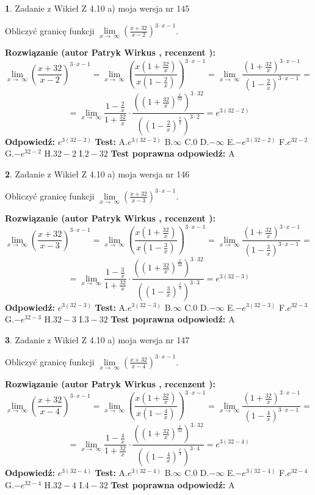 \documentclass[12pt, a4paper]{article}
\theoremstyle{definition} %
\newtheorem{zad}{}
\newcommand{\zadStart}[1]{\begin{zad}#1\newline}
\newcommand{\zadStop}{\end{zad}}
\newcommand{\rozwStart}[2]{\noindent \textbf{Rozwiązanie (autor #1 , recenzent #2): }\newline}
\newcommand{\rozwStop}{\newline}
\newcommand{\odpStart}{\noindent \textbf{Odpowiedź:}\newline}
\newcommand{\odpStop}{\newline}
\newcommand{\testStart}{\noindent \textbf{Test:}\newline}
\newcommand{\testStop}{\newline}
\newcommand{\kluczStart}{\noindent \textbf{Test poprawna odpowiedź:}\newline}
\newcommand{\kluczStop}{\newline}
\begin{document}
\zadStart{Zadanie z Wikieł Z 4.10 a) moja wersja nr 145}


Obliczyć granicę funkcji  $\lim\limits_{x\to\ \infty}(\frac{x+32}{x-2})^{3\cdot x-1}$.
\zadStop
\rozwStart{Patryk Wirkus}{}
$$\lim\limits_{x\to\ \infty}(\frac{x+32}{x-2})^{3\cdot x-1} = \lim\limits_{x\to\ \infty}(\frac{x(1+\frac{32}{x})}{x(1-\frac{2}{x})})^{3\cdot x-1}=\lim\limits_{x\to\ \infty}\frac{(1+\frac{32}{x})^{3\cdot x-1}}{(1-\frac{2}{x})^{3\cdot x-1}}=$$
$$=\lim\limits_{x\to\ \infty}\frac{1-\frac{2}{x}}{1+\frac{32}{x}}\cdot\frac{((1+\frac{32}{x})^{\frac{x}{32}})^{3\cdot32}}{((1-\frac{2}{x})^{\frac{x}{2}})^{3\cdot2}}=e^{3(32-2)}$$
\rozwStop
\odpStart
$e^{3(32-2)}$
\odpStop
\testStart
A.$e^{3(32-2)}$ B.$\infty$ C.$0$ D.$-\infty$ E.$-e^{3(32-2)}$
F.$e^{32-2}$ G.$-e^{32-2}$
H.$32-2$
I.$2-32$
\testStop
\kluczStart
A
\kluczStop



\zadStart{Zadanie z Wikieł Z 4.10 a) moja wersja nr 146}


Obliczyć granicę funkcji  $\lim\limits_{x\to\ \infty}(\frac{x+32}{x-3})^{3\cdot x-1}$.
\zadStop
\rozwStart{Patryk Wirkus}{}
$$\lim\limits_{x\to\ \infty}(\frac{x+32}{x-3})^{3\cdot x-1} = \lim\limits_{x\to\ \infty}(\frac{x(1+\frac{32}{x})}{x(1-\frac{3}{x})})^{3\cdot x-1}=\lim\limits_{x\to\ \infty}\frac{(1+\frac{32}{x})^{3\cdot x-1}}{(1-\frac{3}{x})^{3\cdot x-1}}=$$
$$=\lim\limits_{x\to\ \infty}\frac{1-\frac{3}{x}}{1+\frac{32}{x}}\cdot\frac{((1+\frac{32}{x})^{\frac{x}{32}})^{3\cdot32}}{((1-\frac{3}{x})^{\frac{x}{3}})^{3\cdot3}}=e^{3(32-3)}$$
\rozwStop
\odpStart
$e^{3(32-3)}$
\odpStop
\testStart
A.$e^{3(32-3)}$ B.$\infty$ C.$0$ D.$-\infty$ E.$-e^{3(32-3)}$
F.$e^{32-3}$ G.$-e^{32-3}$
H.$32-3$
I.$3-32$
\testStop
\kluczStart
A
\kluczStop



\zadStart{Zadanie z Wikieł Z 4.10 a) moja wersja nr 147}


Obliczyć granicę funkcji  $\lim\limits_{x\to\ \infty}(\frac{x+32}{x-4})^{3\cdot x-1}$.
\zadStop
\rozwStart{Patryk Wirkus}{}
$$\lim\limits_{x\to\ \infty}(\frac{x+32}{x-4})^{3\cdot x-1} = \lim\limits_{x\to\ \infty}(\frac{x(1+\frac{32}{x})}{x(1-\frac{4}{x})})^{3\cdot x-1}=\lim\limits_{x\to\ \infty}\frac{(1+\frac{32}{x})^{3\cdot x-1}}{(1-\frac{4}{x})^{3\cdot x-1}}=$$
$$=\lim\limits_{x\to\ \infty}\frac{1-\frac{4}{x}}{1+\frac{32}{x}}\cdot\frac{((1+\frac{32}{x})^{\frac{x}{32}})^{3\cdot32}}{((1-\frac{4}{x})^{\frac{x}{4}})^{3\cdot4}}=e^{3(32-4)}$$
\rozwStop
\odpStart
$e^{3(32-4)}$
\odpStop
\testStart
A.$e^{3(32-4)}$ B.$\infty$ C.$0$ D.$-\infty$ E.$-e^{3(32-4)}$
F.$e^{32-4}$ G.$-e^{32-4}$
H.$32-4$
I.$4-32$
\testStop
\kluczStart
A
\kluczStop
\end{document}
